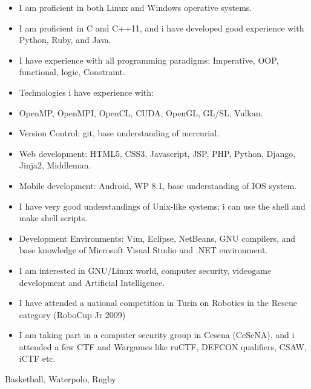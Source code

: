 \documentclass[helvetica,narrow,openbib,notitle,flagCMYK]{europecv}
\begin{document}
\begin{europecv}
	 {
		\begin{itemize}
			\item I am proficient in both Linux and Windows operative systems.
			\item I am proficient in C and C++11, and i have developed good experience with Python, Ruby, and Java.
			\item I have experience with all programming paradigms: Imperative, OOP, functional, logic, Constraint.
			\item Technologies i have experience with:
			\item OpenMP, OpenMPI, OpenCL, CUDA, OpenGL, GL/SL, Vulkan.
			\item Version Control: git, base understanding of mercurial.
			\item Web development: HTML5, CSS3, Javascript, JSP, PHP, Python, Django, Jinja2, Middleman.
			\item Mobile development: Android, WP 8.1, base understanding of IOS system.
			\item I have very good understandings of Unix-like systems; i can use the shell and make shell scripts.
			\item Development Environments: Vim, Eclipse, NetBeans, GNU compilers, and base knowledge of Microsoft Visual Studio and .NET environment.
		\end{itemize}
	}
	 {
		\begin{itemize}
			\item I am interested in GNU/Linux world, computer security, videogame development and Artificial Intelligence. 
			\item I have attended a national competition in Turin on Robotics in the Rescue category (RoboCup Jr 2009) 
			\item I am taking part in a computer security group in Cesena (CeSeNA), and i attended a few CTF and Wargames like ruCTF, DEFCON qualifiers, CSAW, iCTF etc.
		\end{itemize}
	}
	 {Basketball, Waterpolo, Rugby}


	\end{europecv}
\end{document}

